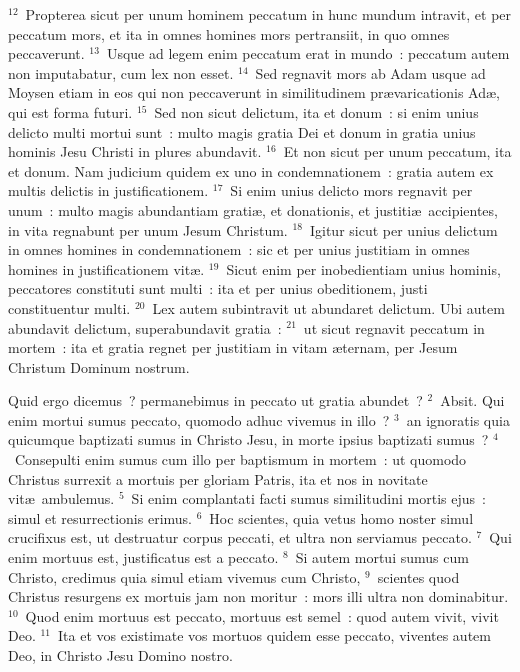 ${}^{12}$~Propterea sicut per unum hominem peccatum in hunc mundum intravit, et per peccatum mors, et ita in omnes homines mors pertransiit, in quo omnes peccaverunt.
${}^{13}$~Usque ad legem enim peccatum erat in mundo~: peccatum autem non imputabatur, cum lex non esset.
${}^{14}$~Sed regnavit mors ab Adam usque ad Moysen etiam in eos qui non peccaverunt in similitudinem pr\ae varicationis Ad\ae , qui est forma futuri.
${}^{15}$~Sed non sicut delictum, ita et donum~: si enim unius delicto multi mortui sunt~: multo magis gratia Dei et donum in gratia unius hominis Jesu Christi in plures abundavit.
${}^{16}$~Et non sicut per unum peccatum, ita et donum. Nam judicium quidem ex uno in condemnationem~: gratia autem ex multis delictis in justificationem.
${}^{17}$~Si enim unius delicto mors regnavit per unum~: multo magis abundantiam grati\ae , et donationis, et justiti\ae\ accipientes, in vita regnabunt per unum Jesum Christum.
${}^{18}$~Igitur sicut per unius delictum in omnes homines in condemnationem~: sic et per unius justitiam in omnes homines in justificationem vit\ae .
${}^{19}$~Sicut enim per inobedientiam unius hominis, peccatores constituti sunt multi~: ita et per unius obeditionem, justi constituentur multi.
${}^{20}$~Lex autem subintravit ut abundaret delictum. Ubi autem abundavit delictum, superabundavit gratia~:
${}^{21}$~ut sicut regnavit peccatum in mortem~: ita et gratia regnet per justitiam in vitam \ae ternam, per Jesum Christum Dominum nostrum.

\lettrine[lines=10,image=true,loversize=0.05,lraise=-0.03]{Q}{}uid ergo dicemus~? permanebimus in peccato ut gratia abundet~?
${}^{2}$~Absit. Qui enim mortui sumus peccato, quomodo adhuc vivemus in illo~?
${}^{3}$~an ignoratis quia quicumque baptizati sumus in Christo Jesu, in morte ipsius baptizati sumus~?
${}^{4}$~Consepulti enim sumus cum illo per baptismum in mortem~: ut quomodo Christus surrexit a mortuis per gloriam Patris, ita et nos in novitate vit\ae\ ambulemus.
${}^{5}$~Si enim complantati facti sumus similitudini mortis ejus~: simul et resurrectionis erimus.
${}^{6}$~Hoc scientes, quia vetus homo noster simul crucifixus est, ut destruatur corpus peccati, et ultra non serviamus peccato.
${}^{7}$~Qui enim mortuus est, justificatus est a peccato.
${}^{8}$~Si autem mortui sumus cum Christo, credimus quia simul etiam vivemus cum Christo,
${}^{9}$~scientes quod Christus resurgens ex mortuis jam non moritur~: mors illi ultra non dominabitur.
${}^{10}$~Quod enim mortuus est peccato, mortuus est semel~: quod autem vivit, vivit Deo.
${}^{11}$~Ita et vos existimate vos mortuos quidem esse peccato, viventes autem Deo, in Christo Jesu Domino nostro.


